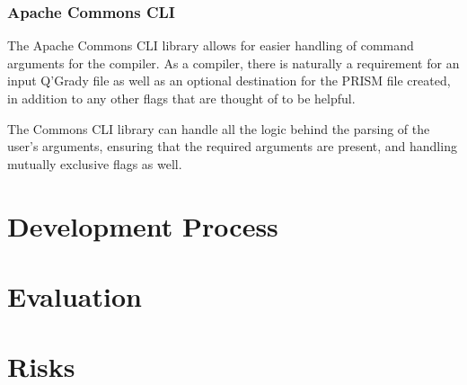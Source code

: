 \documentclass[11pt, a4paper]{article}
\begin{document}

\subsubsection{Apache Commons CLI}
\label{sub:commons_cli}
The Apache Commons CLI library allows for easier handling of command arguments
for the compiler. As a compiler, there is naturally a requirement for an input
Q'Grady file as well as an optional destination for the PRISM file created, in
addition to any other flags that are thought of to be helpful. 

The Commons CLI library can handle all the logic behind the parsing of the
user's arguments, ensuring that the required arguments are present, and handling
mutually exclusive flags as well.




\section{Development Process} %
\label{sec:development_process}


\section{Evaluation} %
\label{sec:evaluation}


\section{Risks} %
\label{sec:risks}

\end{document}
